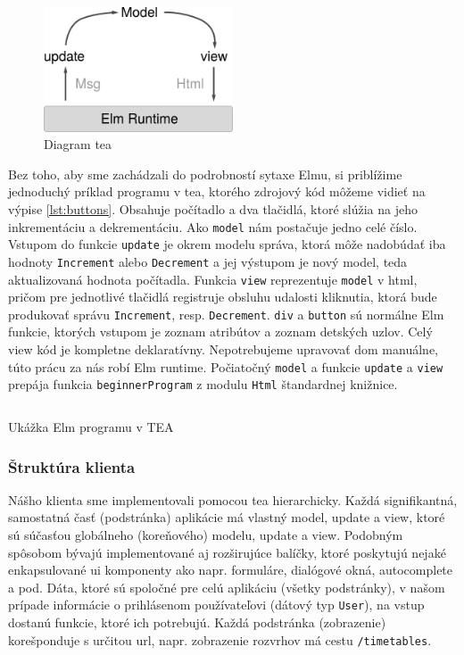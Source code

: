 \begin{figure}
  \centering
  \includegraphics[width=0.5\textwidth]{figures/tea.png}
  \caption{\label{fig:tea} Diagram \acrlong{tea} \cite{tea}}
\end{figure}

Bez toho, aby sme zachádzali do podrobností sytaxe Elmu, si priblížime
jednoduchý príklad programu v \acrshort{tea}, ktorého zdrojový kód môžeme vidieť
na výpise \ref{lst:buttons}. Obsahuje počítadlo a dva tlačidlá, ktoré slúžia na
jeho inkrementáciu a dekrementáciu. Ako \texttt{model} nám postačuje jedno celé
číslo. Vstupom do funkcie \texttt{update} je okrem modelu správa, ktorá môže
nadobúdať iba hodnoty \texttt{Increment} alebo \texttt{Decrement} a jej výstupom
je nový model, teda aktualizovaná hodnota počítadla. Funkcia \texttt{view}
reprezentuje \texttt{model} v \acrshort{html}, pričom pre jednotlivé tlačidlá
registruje obsluhu udalosti kliknutia, ktorá bude produkovať správu
\texttt{Increment}, resp. \texttt{Decrement}. \texttt{div} a \texttt{button} sú
normálne Elm funkcie, ktorých vstupom je zoznam atribútov a zoznam detských
uzlov. Celý view kód je kompletne deklaratívny. Nepotrebujeme upravovať
\acrshort{dom} manuálne, túto prácu za nás robí Elm runtime. Počiatočný
\texttt{model} a funkcie \texttt{update} a \texttt{view} prepája funkcia
\texttt{beginnerProgram} z modulu \texttt{Html} štandardnej knižnice.

\begin{listing}[hp]
  \inputminted{elm}{listings/Buttons.elm}
  \caption{Ukážka Elm programu v TEA \cite{elm_guide}}
  \label{lst:buttons} 
\end{listing}

\subsubsection{Štruktúra klienta}

Nášho klienta sme implementovali pomocou \acrshort{tea} hierarchicky. Každá
signifikantná, samostatná časť (podstránka) aplikácie má vlastný model, update a
view, ktoré sú súčasťou globálneho (koreňového) modelu, update a view. Podobným
spôsobom bývajú implementované aj rozširujúce balíčky, ktoré poskytujú nejaké
enkapsulované \acrshort{ui} komponenty ako napr. formuláre, dialógové okná,
autocomplete a pod. Dáta, ktoré sú spoločné pre celú aplikáciu (všetky
podstránky), v našom prípade informácie o prihlásenom používateľovi (dátový typ
\texttt{User}), na vstup dostanú funkcie, ktoré ich potrebujú. Každá podstránka
(zobrazenie) korešponduje s určitou \acrshort{url}, napr. zobrazenie rozvrhov má
cestu \texttt{/timetables}.

